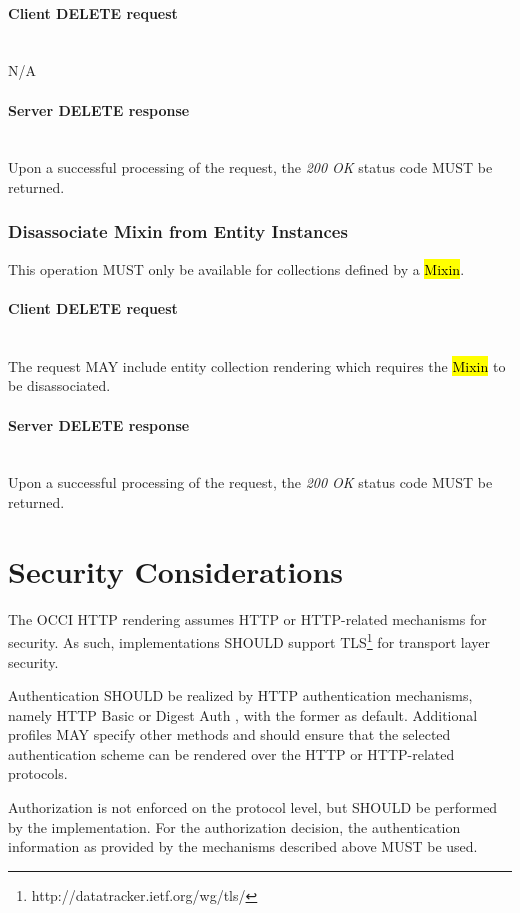 \documentclass[10pt,a4paper]{article}
\begin{document}
\paragraph*{Client DELETE request}\hfill\\
N/A

\paragraph*{Server DELETE response}\hfill\\
Upon a successful processing of the request, the \emph{200 OK} status code MUST be returned.

\subsubsection{Disassociate Mixin from Entity Instances}
This operation MUST only be available for collections defined by a \hl{Mixin}.

\paragraph*{Client DELETE request}\hfill\\
The request MAY include entity collection rendering which requires the \hl{Mixin} to be disassociated.

\paragraph*{Server DELETE response}\hfill\\
Upon a successful processing of the request, the \emph{200 OK} status code MUST be returned.

\section{Security Considerations}
\label{sec:sec_consid}
The OCCI HTTP rendering assumes HTTP or HTTP-related mechanisms for
security. As such, implementations SHOULD support
TLS\footnote{http://datatracker.ietf.org/wg/tls/} for transport layer
security.

Authentication SHOULD be realized by HTTP authentication mechanisms,
namely HTTP Basic or Digest Auth \cite{rfc2617}, with the former as
default. Additional profiles MAY specify other methods and should
ensure that the selected authentication scheme can be rendered over
the HTTP or HTTP-related protocols.

Authorization is not enforced on the protocol level, but SHOULD be
performed by the implementation. For the authorization decision, the
authentication information as provided by the mechanisms described
above MUST be used.
\end{document}
